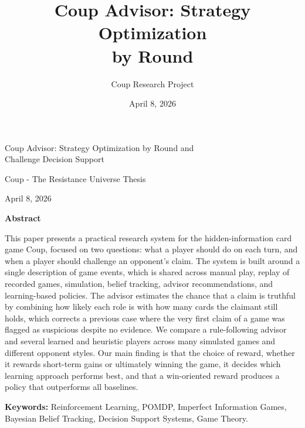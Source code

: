 \documentclass[11pt]{article}
\title{Coup Advisor: \texorpdfstring{Strategy Optimization\\ by Round}{Strategy Optimization by Round}}
\author{Coup Research Project}
\date{April 8, 2026}
\begin{document}
\begin{titlepage}
  \vspace*{\fill}
  \begin{center}
    {\LARGE Coup Advisor: Strategy Optimization by Round and \\ Challenge Decision Support\par}
    \vspace{1.0em}
    {\large Coup - The Resistance Universe Thesis\par}
    \vspace{1.0em}
    {\large April 8, 2026\par}
    \vspace{2.0em}
    {\large\bfseries Abstract\par}
    \vspace{1.8em}
    \begin{minipage}{0.82\textwidth}
      \small
      \linespread{1.5}\selectfont
      This paper presents a practical research system for the hidden-information card game Coup,     
      focused on two questions: what a player should do on each turn, and when a player should 
      challenge an opponent's claim. The system is built around a single description of game events, 
      which is shared across manual play, replay of recorded games, simulation, belief tracking, 
      advisor recommendations, and learning-based policies. The advisor estimates the chance that a 
      claim is truthful by combining how likely each role is with how many cards the claimant still
      holds, which corrects a previous case where the very first claim of a game was flagged as
      suspicious despite no evidence. We compare a rule-following advisor and several learned and
      heuristic players across many simulated games and different opponent styles. Our main finding
      is that the choice of reward, whether it rewards short-term gains or ultimately winning the
      game, it decides which learning approach performs best, and that a win-oriented reward produces a
      policy that outperforms all baselines. 

      
      \vspace{1.5em} 
      \noindent \centering \textbf{Keywords:} Reinforcement Learning, POMDP, Imperfect Information Games, Bayesian Belief Tracking, Decision Support Systems, Game Theory.    
    \end{minipage}
  \end{center}
  \vspace*{\fill}
\end{titlepage}
\end{document}
